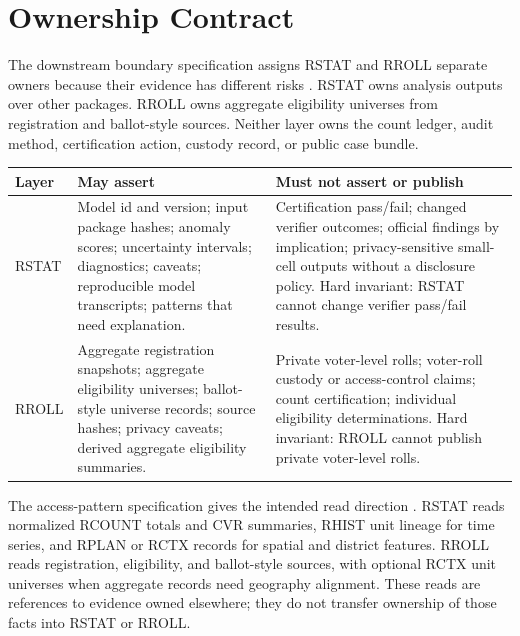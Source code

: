 \section{Ownership Contract}

The downstream boundary specification assigns RSTAT and RROLL separate owners
because their evidence has different risks \citep{civic-evidence-boundaries-2026}.
RSTAT owns analysis outputs over other packages. RROLL owns aggregate eligibility
universes from registration and ballot-style sources. Neither layer owns the
count ledger, audit method, certification action, custody record, or public case
bundle.

\begin{center}
\small
\begin{tabularx}{\textwidth}{lXX}
\toprule
Layer & May assert & Must not assert or publish \\
\midrule
RSTAT &
Model id and version; input package hashes; anomaly scores; uncertainty
intervals; diagnostics; caveats; reproducible model transcripts; patterns that
need explanation. &
Certification pass/fail; changed verifier outcomes; official findings by
implication; privacy-sensitive small-cell outputs without a disclosure policy.
Hard invariant: RSTAT cannot change verifier pass/fail results. \\
\addlinespace
RROLL &
Aggregate registration snapshots; aggregate eligibility universes; ballot-style
universe records; source hashes; privacy caveats; derived aggregate eligibility
summaries. &
Private voter-level rolls; voter-roll custody or access-control claims; count
certification; individual eligibility determinations. Hard invariant: RROLL
cannot publish private voter-level rolls. \\
\bottomrule
\end{tabularx}
\end{center}

The access-pattern specification gives the intended read direction
\citep{civic-evidence-boundaries-2026}. RSTAT reads normalized RCOUNT totals and
CVR summaries, RHIST unit lineage for time series, and RPLAN or RCTX records for
spatial and district features. RROLL reads registration, eligibility, and
ballot-style sources, with optional RCTX unit universes when aggregate records
need geography alignment. These reads are references to evidence owned
elsewhere; they do not transfer ownership of those facts into RSTAT or RROLL.

